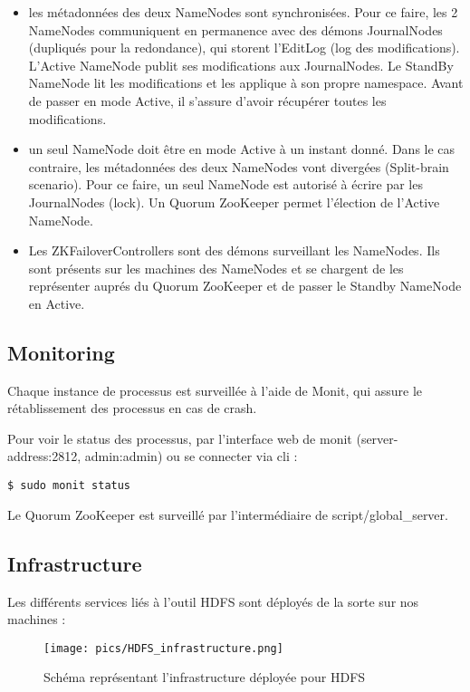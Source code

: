 \begin{itemize}
	\item les métadonnées des deux NameNodes sont synchronisées. Pour ce faire, les 2 NameNodes communiquent en permanence avec des démons JournalNodes (dupliqués pour la redondance), qui storent l'EditLog (log des modifications). L'Active NameNode publit ses modifications aux JournalNodes. Le StandBy NameNode lit les modifications et les applique à son propre namespace. Avant de passer en mode Active, il s'assure d'avoir récupérer toutes les modifications.
	\item un seul NameNode doit être en mode Active à un instant donné. Dans le cas contraire, les métadonnées des deux NameNodes vont divergées (Split-brain scenario). Pour ce faire, un seul NameNode est autorisé à écrire par les JournalNodes (lock). Un Quorum ZooKeeper permet l'élection de l'Active NameNode.
	\item Les ZKFailoverControllers sont des démons surveillant les NameNodes. Ils sont présents sur les machines des NameNodes et se chargent de les représenter auprés du Quorum ZooKeeper et de passer le Standby NameNode en Active.
\end{itemize}

\subsection{Monitoring}

Chaque instance de processus est surveillée à l'aide de Monit, qui assure le rétablissement des processus en cas de crash.

Pour voir le status des processus, par l'interface web de monit (server-address:2812, admin:admin) ou se connecter via cli :

\begin{lstlisting}
$ sudo monit status
\end{lstlisting}


Le Quorum ZooKeeper est surveillé par l'intermédiaire de script/global\_server.

\subsection{Infrastructure}
Les différents services liés à l'outil HDFS sont déployés de la sorte sur nos machines :

\begin{figure}[h]
    \centering
    \texttt{[image: pics/HDFS\_infrastructure.png]}
    \caption{Schéma représentant l'infrastructure déployée pour HDFS}
\end{figure}
\FloatBarrier

